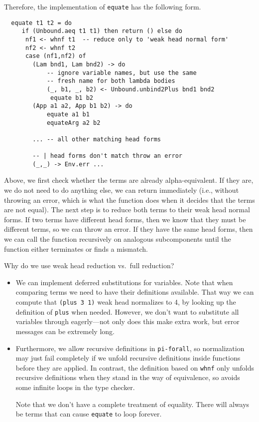\documentclass{article}
\newcommand\cd[1]{\lstinline[language=Haskell]{#1}}
\newcommand\pif{\texttt{pi-forall}\xspace}
\theoremstyle{definition}
\begin{document}
Therefore, the implementation of \cd{equate} has the following form.
\begin{verbatim}
  equate t1 t2 = do
     if (Unbound.aeq t1 t1) then return () else do
      nf1 <- whnf t1  -- reduce only to 'weak head normal form'
      nf2 <- whnf t2
      case (nf1,nf2) of
        (Lam bnd1, Lam bnd2) -> do
            -- ignore variable names, but use the same
            -- fresh name for both lambda bodies
            (_, b1, _, b2) <- Unbound.unbind2Plus bnd1 bnd2
             equate b1 b2
        (App a1 a2, App b1 b2) -> do
            equate a1 b1
            equateArg a2 b2

        ... -- all other matching head forms

        -- | head forms don't match throw an error
        (_,_) -> Env.err ...
\end{verbatim}
Above, we first check whether the terms are already alpha-equivalent. If they
are, we do not need to do anything else, we can return immediately
(i.e., without throwing an error, which is what the function does when it
decides that the terms are not equal). The next step is to reduce both terms
to their weak head normal forms.  If two terms have different head forms, then
we know that they must be different terms, so we can throw an error. If they have
the same head forms, then we can call the function recursively on analogous
subcomponents until the function either terminates or finds a mismatch.

Why do we use weak head reduction vs.~full reduction?

\begin{itemize}
\item
  We can implement deferred substitutions for variables. Note that when
  comparing terms we need to have their definitions available. That way we
  can compute that \texttt{(plus\ 3\ 1)} weak head normalizes to 4, by
  looking up the definition of \texttt{plus} when needed. However, we
  don't want to substitute all variables through eagerly---not only does
  this make extra work, but error messages can be extremely long.
\item Furthermore, we allow recursive definitions in \pif, so normalization
  may just fail completely if we unfold recursive definitions inside
  functions before they are applied. In contrast, the definition based on
  \texttt{whnf} only unfolds recursive definitions when they stand in the way
  of equivalence, so avoids some infinite loops in the type checker.

  Note that we don't have a complete treatment of equality. There will always
  be terms that can cause \texttt{equate} to loop forever.
\end{itemize}
\end{document}
